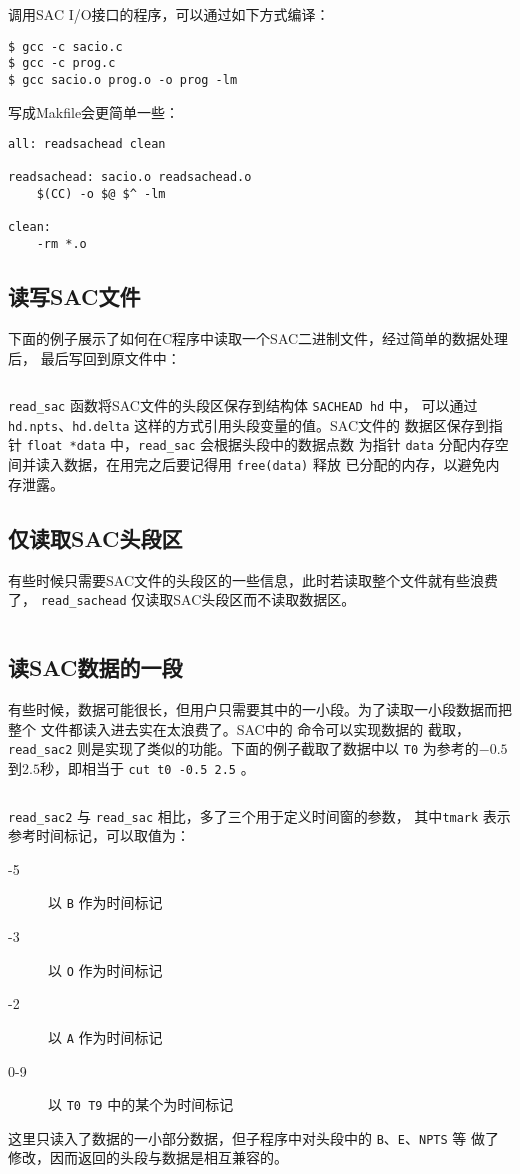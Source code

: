 调用SAC I/O接口的程序，可以通过如下方式编译：
\begin{verbatim}
$ gcc -c sacio.c
$ gcc -c prog.c
$ gcc sacio.o prog.o -o prog -lm
\end{verbatim}

写成Makfile会更简单一些：
\begin{verbatim}
all: readsachead clean

readsachead: sacio.o readsachead.o
    $(CC) -o $@ $^ -lm

clean:
    -rm *.o
\end{verbatim}

\subsection{读写SAC文件}
下面的例子展示了如何在C程序中读取一个SAC二进制文件，经过简单的数据处理后，
最后写回到原文件中：
\inputminted{C}{./sacio/readsac.c}
\verb|read_sac| 函数将SAC文件的头段区保存到结构体 \texttt{SACHEAD hd} 中，
可以通过 \texttt{hd.npts}、\texttt{hd.delta} 这样的方式引用头段变量的值。SAC文件的
数据区保存到指针 \texttt{float *data} 中，\verb|read_sac| 会根据头段中的数据点数
为指针 \texttt{data} 分配内存空间并读入数据，在用完之后要记得用 \texttt{free(data)} 释放
已分配的内存，以避免内存泄露。

\subsection{仅读取SAC头段区}
有些时候只需要SAC文件的头段区的一些信息，此时若读取整个文件就有些浪费了，
\verb|read_sachead| 仅读取SAC头段区而不读取数据区。
\inputminted{C}{./sacio/readsachead.c}

\subsection{读SAC数据的一段}
有些时候，数据可能很长，但用户只需要其中的一小段。为了读取一小段数据而把整个
文件都读入进去实在太浪费了。SAC中的  命令可以实现数据的
截取，\verb|read_sac2| 则是实现了类似的功能。下面的例子截取了数据中以 \texttt{T0} 
为参考的$-0.5$到$2.5$秒，即相当于 \texttt{cut t0 -0.5 2.5} 。
\inputminted{C}{./sacio/readsac2.c}
\verb|read_sac2| 与 \verb|read_sac| 相比，多了三个用于定义时间窗的参数，
其中\texttt{tmark} 表示参考时间标记，可以取值为：
\begin{description}
\item[-5] 以 \texttt{B} 作为时间标记
\item[-3] 以 \texttt{O} 作为时间标记
\item[-2] 以 \texttt{A} 作为时间标记
\item[0-9] 以 \texttt{T0 T9} 中的某个为时间标记
\end{description}
这里只读入了数据的一小部分数据，但子程序中对头段中的 \texttt{B}、\texttt{E}、\texttt{NPTS} 等
做了修改，因而返回的头段与数据是相互兼容的。

